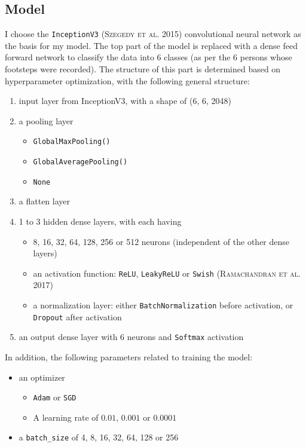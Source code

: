 \documentclass{article}
\begin{document}
\subsection{Model}
I choose the \verb+InceptionV3+ (\textsc{Szegedy et al. 2015}) convolutional neural network as the basis for my model. The top part of the model is replaced with a dense feed forward network to classify the data into 6 classes (as per the 6 persons whose footsteps were recorded). The structure of this part is determined based on hyperparameter optimization, with the following general structure:

\begin{enumerate}
  \item input layer from InceptionV3, with a shape of (6, 6, 2048)
  \item a pooling layer
  \begin{itemize}
    \item \verb+GlobalMaxPooling()+
    \item \verb+GlobalAveragePooling()+
    \item \verb+None+
  \end{itemize}
  \item a flatten layer
  \item 1 to 3 hidden dense layers, with each having
  \begin{itemize}
    \item 8, 16, 32, 64, 128, 256 or 512 neurons (independent of the other dense layers)
    \item an activation function: \verb+ReLU+, \verb+LeakyReLU+ or \verb+Swish+ (\textsc{Ramachandran et al. 2017})
    \item a normalization layer: either \verb+BatchNormalization+ before activation, or \verb+Dropout+ after activation
  \end{itemize}
  \item an output dense layer with 6 neurons and \verb+Softmax+ activation
\end{enumerate}

In addition, the following parameters related to training the model:
\begin{itemize}
  \item an optimizer
  \begin{itemize}
    \item \verb+Adam+ or \verb+SGD+
    \item A learning rate of $0.01$, $0.001$ or $0.0001$
  \end{itemize}
  \item a \verb+batch_size+ of 4, 8, 16, 32, 64, 128 or 256
\end{itemize}
\end{document}
